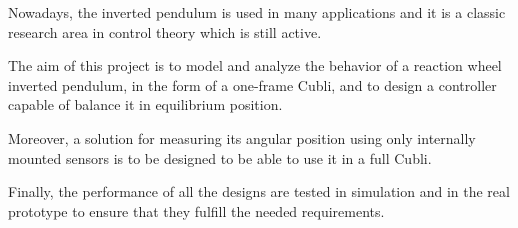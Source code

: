 Nowadays, the inverted pendulum is used in many applications and it is a classic research area in control theory which is still active.

The aim of this project is to model and analyze the behavior of a reaction wheel inverted pendulum, in the form of a one-frame Cubli, and to design a controller capable of balance it in equilibrium position. 

Moreover, a solution for measuring its angular position using only internally mounted sensors is to be designed to be able to use it in a full Cubli. 

Finally, the performance of all the designs are tested in simulation and in the real prototype to ensure that they fulfill the needed requirements.